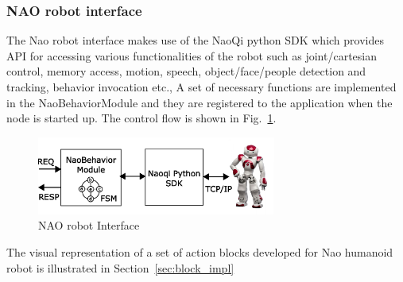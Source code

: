 \subsubsection{NAO robot interface}
\label{sssec:nao_interface}
The Nao robot interface makes use of the NaoQi python SDK which provides API for accessing various functionalities of the robot such as joint/cartesian control, memory access, motion, speech, object/face/people detection and tracking, behavior invocation etc., A set of necessary functions are implemented in the NaoBehaviorModule and they are registered to the application when the node is started up. The control flow is shown in Fig.~\ref{fig:nao_interface}.
\begin{figure}[H]
\centering
\includegraphics[width=0.7\textwidth]{assets/NaoBehaviorModule.eps}
\caption[NAO robot Interface]{NAO robot Interface}
\label{fig:nao_interface}
\end{figure}
The visual representation of a set of action blocks developed for Nao humanoid robot is illustrated in Section~\ref{sec:block_impl}
